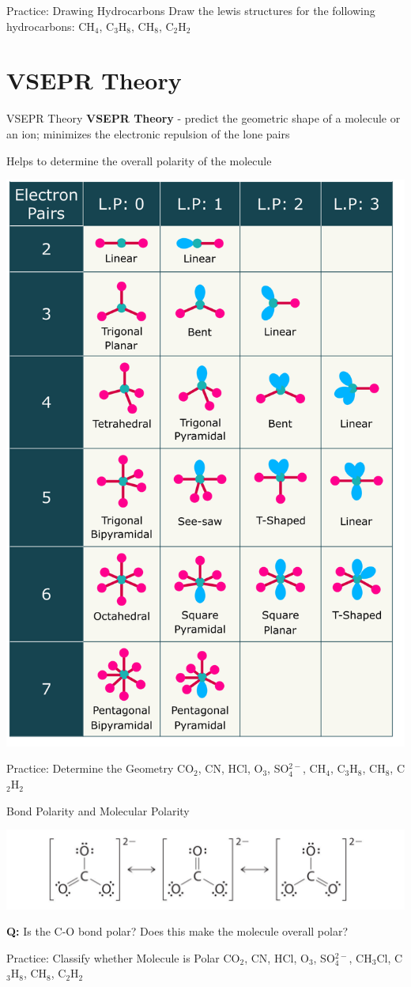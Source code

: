 \documentclass[11pt]{beamer}
\begin{document}
\begin{frame}{Practice: Drawing Hydrocarbons}
  Draw the lewis structures for the following hydrocarbons:
  CH$_4$, C$_3$H$_8$, CH$_8$, C$_2$H$_2$
  \vspace{1.75in}
\end{frame}

\section{VSEPR Theory}

\begin{frame}{VSEPR Theory}
  \textbf{VSEPR Theory} - predict the geometric shape of a
  molecule or an ion; minimizes the electronic repulsion of
  the lone pairs

  Helps to determine the overall polarity of the molecule
\end{frame}

\begin{frame}
  \vspace{0.15in}
  \centering
  \includegraphics[width=0.6\linewidth]{vsepr_diag}
\end{frame}

\begin{frame}{Practice: Determine the Geometry}
  CO$_2$, CN, HCl, O$_3$, SO$_4^{2-}$,
  CH$_4$, C$_3$H$_8$, CH$_8$, C$_2$H$_2$
  \vspace{1.75in}
\end{frame}

\begin{frame}{Bond Polarity and Molecular Polarity}
  \begin{center}
    \includegraphics[width=1\linewidth]{resonance_struct}
  \end{center}

  \textbf{Q:} Is the C-O bond polar? Does this make the molecule
  overall polar?
\end{frame}

\begin{frame}{Practice: Classify whether Molecule is Polar}
  CO$_2$, CN, HCl, O$_3$, SO$_4^{2-}$,
  CH$_3$Cl, C$_3$H$_8$, CH$_8$, C$_2$H$_2$
  \vspace{1.75in}
\end{frame}
\end{document}
